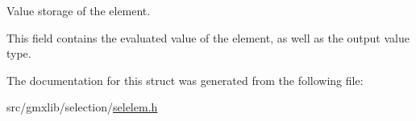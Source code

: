 \-Value storage of the element. 

\-This field contains the evaluated value of the element, as well as the output value type. 

\-The documentation for this struct was generated from the following file\-:\begin{DoxyCompactItemize}
\item 
src/gmxlib/selection/\hyperlink{selelem_8h}{selelem.\-h}\end{DoxyCompactItemize}
